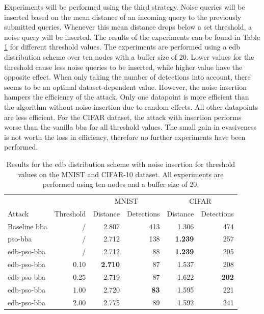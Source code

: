 Experiments will be performed using the third strategy. Noise queries will be inserted based on the mean distance of an incoming query to the previously submitted queries. Whenever this mean distance drops below a set threshold, a noise query will be inserted. The results of the experiments can be found in Table \ref{tbl:thresholds} for different threshold values. The experiments are performed using a \gls{edb} distribution scheme over ten nodes with a buffer size of 20. Lower values for the threshold cause less noise queries to be inserted, while higher value have the opposite effect. When only taking the number of detections into account, there seems to be an optimal dataset-dependent value. However, the noise insertion hampers the efficiency of the attack. Only one datapoint is more efficient than the algorithm without noise insertion due to random effects. All other datapoints are less efficient. For the CIFAR dataset, the attack with insertion performs worse than the vanilla \gls{bba} for all threshold values. The small gain in evasiveness is not worth the loss in efficiency, therefore no further experiments have been performed.\\

\begin{table}
\centering
\caption[Results for different buffer sizes]{Results for the \gls{edb} distribution scheme with noise insertion for threshold values on the MNIST and CIFAR-10 dataset. All experiments are performed using ten nodes and a buffer size of 20.}
\label{tbl:thresholds}
\begin{tabular}{lrrrrr}\toprule
			&& \multicolumn{2}{c}{MNIST} &\multicolumn{2}{c}{CIFAR} \\ \cmidrule(r){3-4} \cmidrule(r){5-6}
	Attack				&Threshold &Distance	&Detections	&Distance	&Detections \\ \midrule
	Baseline \gls{bba}			  &/			&2.807		&413		&1.306			&474 \\
	\gls{pso}-\gls{bba} 		  &/			&2.712		&138		&\textbf{1.239}	&257 \\ 
	\gls{edb}-\gls{pso}-\gls{bba} &/			&2.712		&88			&\textbf{1.239}	&205 \\ \addlinespace[\linespace]
	\gls{edb}-\gls{pso}-\gls{bba} &0.10		&\textbf{2.710}		&87			&1.537			&208 \\
	\gls{edb}-\gls{pso}-\gls{bba} &0.25		&2.719		&87			&1.622			&\textbf{202} \\
	\gls{edb}-\gls{pso}-\gls{bba} &1.00		&2.720		&\textbf{83}&1.595			&221 \\
	\gls{edb}-\gls{pso}-\gls{bba} &2.00		&2.775		&89			&1.592			&241 \\
	\bottomrule
	\end{tabular}
\end{table}

